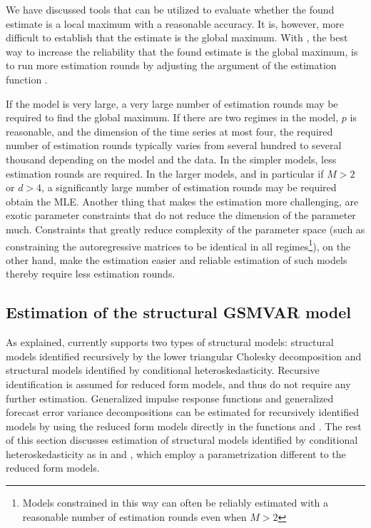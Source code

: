 \documentclass[nojss]{jss}
\begin{document}
We have discussed tools that can be utilized to evaluate whether the found estimate is a local maximum with a reasonable accuracy. It is, however, more difficult to establish that the estimate is the global maximum. With , the best way to increase the reliability that the found estimate is the global maximum, is to run more estimation rounds by adjusting the argument  of the estimation function .

If the model is very large, a very large number of estimation rounds may be required to find the global maximum. If there are two regimes in the model, $p$ is reasonable, and the dimension of the time series at most four, the required number of estimation rounds typically varies from several hundred to several thousand depending on the model and the data. In the simpler models, less estimation rounds are required. In the larger models, and in particular if $M>2$ or $d>4$, a significantly large number of estimation rounds may be required obtain the MLE. Another thing that makes the estimation more challenging, are exotic parameter constraints that do not reduce the dimension of the parameter much. Constraints that greatly reduce complexity of the parameter space (such as constraining the autoregressive matrices to be identical in all regimes\footnote{Models constrained in this way can often be reliably estimated with a reasonable number of estimation rounds even when $M>2$}), on the other hand, make the estimation easier and reliable estimation of such models thereby require less estimation rounds.


\subsection{Estimation of the structural GSMVAR model}\label{sec:estim_structural}


As explained,  currently supports two types of structural models: structural models identified recursively by the lower triangular Cholesky decomposition and structural models identified by conditional heteroskedasticity. Recursive identification is assumed for reduced form models, and thus do not require any further estimation.  Generalized impulse response functions and generalized forecast error variance decompositions can be estimated for recursively identified models by using the reduced form models directly in the functions  and . The rest of this section discusses estimation of structural models identified by conditional heteroskedasticity as in \cite{Virolainen:2025} and \cite{Virolainen2:2021}, which employ a parametrization different to the reduced form models.
\end{document}
